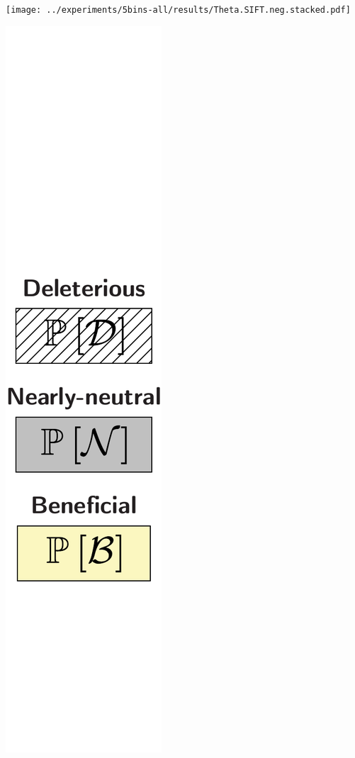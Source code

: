 \documentclass{article}
\begin{document}
\begin{center}
\begin{minipage}{0.09\linewidth}
        \end{minipage}
        \begin{minipage}{0.9\linewidth}
            \texttt{[image: ../experiments/5bins-all/results/Theta.SIFT.neg.stacked.pdf]} \\
        \end{minipage}
        \begin{minipage}{0.09\linewidth}
            \includegraphics[width=\linewidth, page=1]{artworks/legend.polycat}

\end{minipage}
\end{center}
\end{document}
